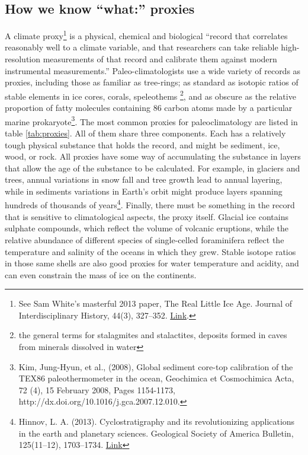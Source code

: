 \documentclass[amstex,12pt]{book}
\begin{document}
\subsection{How we know ``what:'' proxies}
A climate proxy\footnote{See Sam White's masterful 2013 paper, The Real Little Ice Age. Journal of Interdisciplinary History, 44(3), 327–352. \href{https://doi.org/10.1162/JINH_a_00574}{Link}.} is a
physical, chemical and biological ``record that correlates reasonably well to a climate variable, and that researchers can take reliable high-resolution measurements of that record and calibrate them against modern instrumental measurements.'' Paleo-climatologists use a wide variety of records as proxies, including those as familiar as tree-rings; as standard as isotopic ratios of stable elements in ice cores, corals, speleothems \footnote{the general terms for stalagmites and stalactites, deposits formed in caves from minerals dissolved in water}, and as obscure as the relative proportion of fatty molecules containing 86 carbon atoms made by a particular marine prokaryote\footnote{Kim, Jung-Hyun, et al., (2008), Global sediment core-top calibration of the TEX86 paleothermometer in the ocean, Geochimica et Cosmochimica Acta, 72 (4), 15 February 2008, Pages 1154-1173, http://dx.doi.org/10.1016/j.gca.2007.12.010.}. The most common proxies for paleoclimatology are listed in table \ref{tab:proxies}. All of them share three components. Each has a relatively tough physical substance that holds the record, and  might be sediment, ice, wood, or rock. All proxies have some way of accumulating the substance in layers that allow the age of the substance to be calculated. For example, in glaciers and trees, annual variations in snow fall and tree growth lead to annual layering, while in sediments variations in Earth's orbit might produce layers spanning hundreds of thousands of years\footnote{Hinnov, L. A. (2013). Cyclostratigraphy and its revolutionizing applications in the earth and planetary sciences. Geological Society of America Bulletin, 125(11–12), 1703–1734. \href{https://doi.org/10.1130/B30934.1}{Link}}. Finally, there must be something in the record that is sensitive to climatological aspects, the proxy itself. Glacial ice contains sulphate compounds, which reflect the volume of volcanic eruptions, while the relative abundance of different species of single-celled foraminifera reflect the temperature and salinity of the oceans in which they grew. Stable isotope ratios in those same shells are also good proxies for water temperature and acidity, and can even constrain the mass of ice on the continents.    
\end{document}
